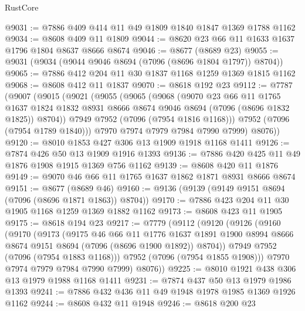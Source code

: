\begin{lexlean}{RustCore}
\begin{coremodule}
@9031 := @7886 @409 @414 @11 @49 @1809 @1840 @1847 @1369 @1788 @1162
@9034 := @8608 @409 @11 @1809
@9044 := @8620 @23 @66 @11 @1633 @1637 @1796 @1804 @8637 @8666 @8674
@9046 := @8677 (@8689 @23)
@9055 := @9031 (@9034 (@9044 @9046 @8694 (@7096 (@8696 @1804 @1797)) @8704))
@9065 := @7886 @412 @204 @11 @30 @1837 @1168 @1259 @1369 @1815 @1162
@9068 := @8608 @412 @11 @1837
@9070 := @8618 @192 @23
@9112 := @7787
    (@9007
      (@9015
        (@9021
          (@9055
            (@9065
              (@9068
                (@9070
                  @23
                  @66
                  @11
                  @1765
                  @1637
                  @1824
                  @1832
                  @8931
                  @8666
                  @8674
                  @9046
                  @8694
                  (@7096 (@8696 @1832 @1825))
                  @8704))
              @7949
              @7952
              (@7096 (@7954 @1816 @1168)))
            @7952
            (@7096 (@7954 @1789 @1840)))
          @7970
          @7974
          @7979
          @7984
          @7990
          @7999)
        @8076))
@9120 := @8010 @1853 @427 @306 @13 @1909 @1918 @1168 @1411
@9126 := @7874 @426 @50 @13 @1909 @1916 @1393
@9136 := @7886 @420 @425 @11 @49 @1876 @1908 @1915 @1369 @756 @1162
@9139 := @8608 @420 @11 @1876
@9149 := @9070 @46 @66 @11 @1765 @1637 @1862 @1871 @8931 @8666 @8674
@9151 := @8677 (@8689 @46)
@9160 := @9136 (@9139 (@9149 @9151 @8694 (@7096 (@8696 @1871 @1863)) @8704))
@9170 := @7886 @423 @204 @11 @30 @1905 @1168 @1259 @1369 @1882 @1162
@9173 := @8608 @423 @11 @1905
@9175 := @8618 @194 @23
@9217 := @7779
    (@9112
      (@9120
        (@9126
          (@9160
            (@9170
              (@9173
                (@9175
                  @46
                  @66
                  @11
                  @1776
                  @1637
                  @1891
                  @1900
                  @8994
                  @8666
                  @8674
                  @9151
                  @8694
                  (@7096 (@8696 @1900 @1892))
                  @8704))
              @7949
              @7952
              (@7096 (@7954 @1883 @1168)))
            @7952
            (@7096 (@7954 @1855 @1908)))
          @7970
          @7974
          @7979
          @7984
          @7990
          @7999)
        @8076))
@9225 := @8010 @1921 @438 @306 @13 @1979 @1988 @1168 @1411
@9231 := @7874 @437 @50 @13 @1979 @1986 @1393
@9241 := @7886 @432 @436 @11 @49 @1948 @1978 @1985 @1369 @1926 @1162
@9244 := @8608 @432 @11 @1948
@9246 := @8618 @200 @23

\end{coremodule}
\end{lexlean}
